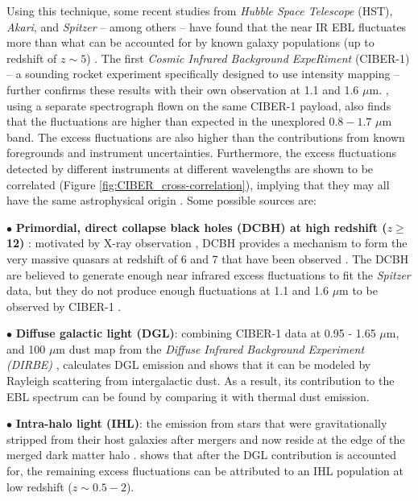 Using this technique, some recent studies from \textit{Hubble Space Telescope} (HST), \textit{Akari}, and \textit{Spitzer} -- among others -- have found that the near IR EBL fluctuates more than what can be accounted for by known galaxy populations (up to redshift of $z \sim 5$) \citep{Matsumoto2005, Matsumoto2011}. 
The first \textit{Cosmic Infrared Background ExpeRiment} (CIBER-1) \citep{Bock2006, Zemcov2013, Bock2013, Korngut2013, Tsumura2013, ZemcovScience} -- a sounding rocket experiment specifically designed to use intensity mapping -- further confirms these results with their own observation at 1.1 and 1.6 $\mu$m. \citet{Matsuura2017}, using a separate spectrograph flown on the same CIBER-1 payload, also finds that the fluctuations are higher than expected in the unexplored $0.8-1.7$ $\mu$m band.
The excess fluctuations are also higher than the contributions from known foregrounds and instrument uncertainties. Furthermore, the excess fluctuations detected by different instruments at different wavelengths are shown to be correlated (Figure \ref{fig:CIBER_cross-correlation}), implying that they may all have the same astrophysical origin \citep{ZemcovScience}. Some possible sources are:

\noindent $\bullet$ \textbf{Primordial, direct collapse black holes (DCBH) at high redshift ($z \geq $ 12)} \citep{Cappelluti2013,Yue2013}: motivated by X-ray observation \citep{Yue2013}, DCBH provides a mechanism to form the very massive quasars at redshift of 6 and 7 that have been observed \citep{Fan2001, Fan2003, Fan2004, Fan2006}. The DCBH are believed to generate enough near infrared excess fluctuations to fit the \textit{Spitzer} data, but they do not produce enough fluctuations at 1.1 and 1.6 $\mu$m to be observed by CIBER-1 \citep{ZemcovScience}.

\noindent $\bullet$ \textbf{Diffuse galactic light (DGL)}: combining CIBER-1 data at 0.95 - 1.65 $\mu$m, and 100 $\mu$m dust map from the \emph{Diffuse Infrared Background Experiment (DIRBE)} \citep{Schlegel1998}, \citet{Arai2015} calculates DGL emission and shows that it can be modeled by Rayleigh scattering from intergalactic dust. As a result, its contribution to the EBL spectrum can be found by comparing it with thermal dust emission.

\noindent $\bullet$ \textbf{Intra-halo light (IHL)}: the emission from stars that were gravitationally stripped from their host galaxies after mergers and now reside at the edge of the merged dark matter halo \citep{Cooray2012,ZemcovScience}.
\citet{Cooray2012} shows that after the DGL contribution is accounted for, the remaining excess fluctuations can be attributed to an IHL population at low redshift ($z \sim 0.5-2$). 

